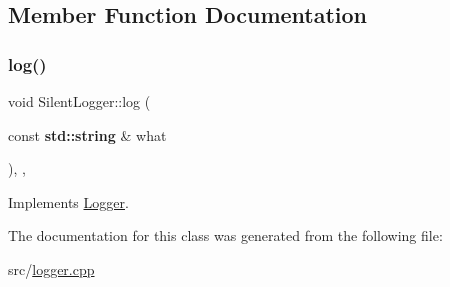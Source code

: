 \subsection{Member Function Documentation}
\mbox{\label{class_silent_logger_aa1b9872cb1585ec35051b3264d06aefd}} 
\subsubsection{\texorpdfstring{log()}{log()}}
{\footnotesize\ttfamily void Silent\+Logger\+::log (\begin{DoxyParamCaption}\item[{const \textbf{ std\+::string} \&}]{what }\end{DoxyParamCaption})\hspace{0.3cm}{\ttfamily [inline]}, {\ttfamily [final]}, {\ttfamily [virtual]}}



Implements \hyperlink{class_logger_a20f6e95efb1eab08269484d8745feb65}{Logger}.



The documentation for this class was generated from the following file\+:\begin{DoxyCompactItemize}
\item 
src/\hyperlink{logger_8cpp}{logger.\+cpp}\end{DoxyCompactItemize}
